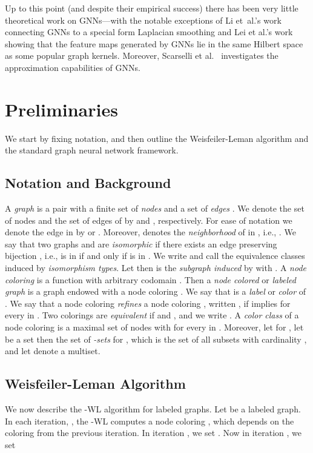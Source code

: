 \documentclass[letterpaper]{article}
\theoremstyle{definition}
\newcommand{\new}[1]{\emph{#1}}
\begin{document}
Up to this point (and despite their empirical success) there has been very little theoretical work on GNNs---with the notable exceptions of Li et\ al.'s \cite{Li+2018a} work connecting GNNs to a special form Laplacian smoothing and Lei et al.'s\@ \cite{Lei+2017} work showing that the feature maps generated by GNNs lie in the same Hilbert space as some popular graph kernels. Moreover, Scarselli et al.\ \cite{Sca+2009a} investigates the approximation capabilities of GNNs. 

\section{Preliminaries}\label{prelim}

We start by fixing notation, and then outline the Weisfeiler-Leman algorithm and the standard graph neural network framework.  

\subsection{Notation and Background}
A \new{graph}  is a pair  with a finite set of \new{nodes}  and a set of \new{edges} . We denote the set of nodes and the set of edges of  by  and , respectively. For ease of notation we denote the edge  in  by  or .
Moreover,  denotes the \new{neighborhood} of  in , i.e., . We say that two graphs  and  are \new{isomorphic} if there exists an edge preserving bijection , i.e.,  is in  if and only if  is in . We write  and call the equivalence classes induced by  \new{isomorphism types}. Let  then  is the \new{subgraph induced} by  with . A \new{node coloring} is a function  with arbitrary codomain . Then a  \new{node colored} or \new{labeled graph}   is a graph  endowed with a node coloring . We say that  is a \new{label} or \new{color} of . We say that a node coloring  \new{refines} a node coloring , written , if  implies  for every  in . 
Two colorings are \new{equivalent} if  and , and we write .
A \new{color class}  of a node coloring  is a maximal set of nodes with  for every  in . Moreover, let  for , let  be a set then the set of \new{-sets}   for , which is the set of all subsets with cardinality , and let  denote a multiset.

\subsection{Weisfeiler-Leman Algorithm}
We now describe the \textsc{-WL} algorithm for labeled graphs. Let  be a labeled graph. In each iteration, , the -WL computes a node coloring ,
which depends on the coloring from the previous iteration.
In iteration , we set . Now in iteration , we set 
\end{document}
